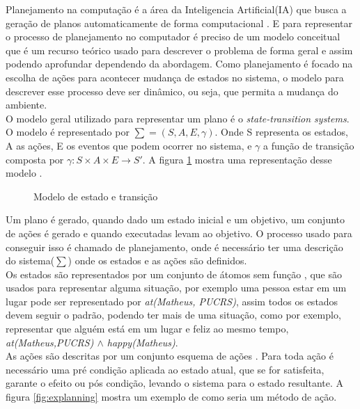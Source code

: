 Planejamento na computação é a área da Inteligencia Artificial(IA) que busca a geração de planos automaticamente de forma computacional \cite{ghallab2004automated}. E para representar o processo de planejamento no computador é preciso de um modelo conceitual que é um recurso teórico usado para descrever o problema de forma geral e assim podendo aprofundar dependendo da abordagem. Como planejamento é  focado na escolha de ações para acontecer mudança de estados no sistema, o modelo para descrever esse processo deve ser dinâmico, ou seja, que permita a mudança do ambiente\cite{ghallab2004automated}. \\

O modelo geral utilizado para representar um plano é o \textit{state-transition systems}. O modelo é representado por $\sum = (S, A, E, \gamma) $. Onde S representa os estados, A as ações, E os eventos que podem ocorrer no sistema, e $\gamma$ a função de transição composta por $ \gamma: S \times A \times E \rightarrow S'$. A figura \ref{fig:planmodelo} mostra uma representação desse modelo \cite{ghallab2004automated}.


\begin{figure}[ht]
	\centering
	\caption{Modelo de estado e transição}
	\label{fig:planmodelo}
\end{figure} 

Um plano é gerado, quando dado um estado inicial e um objetivo, um conjunto de ações é gerado e quando executadas levam ao objetivo. O processo usado para conseguir isso é chamado de planejamento, onde é necessário ter uma descrição do sistema($\sum$) onde os estados e as ações são definidos.\\ 
Os estados são representados por um conjunto de átomos sem função \cite{intelligence2003modern}, que são usados para representar alguma situação, por exemplo uma pessoa estar em um lugar pode ser representado por \textit{at(Matheus, PUCRS)}, assim todos os estados devem seguir o padrão, podendo ter mais de uma situação, como por exemplo, representar que alguém está em um lugar e feliz ao mesmo tempo, \textit{at(Matheus,PUCRS) $\wedge$ happy(Matheus)}. \\
As ações são descritas por um conjunto esquema de ações \cite{intelligence2003modern}. Para toda ação é necessário uma pré condição aplicada ao estado atual, que se for satisfeita, garante o efeito ou pós condição, levando o sistema para o estado resultante. A figura \ref{fig:explanning} mostra um exemplo de como seria um método de ação. \\

